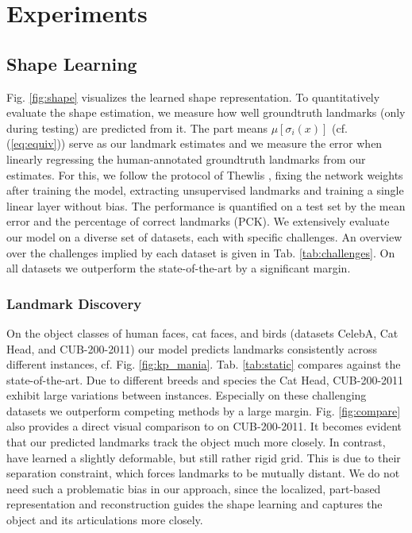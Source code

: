 \chapter{Experiments}

\section{Shape Learning}
	Fig. \ref{fig:shape} visualizes the learned shape representation.
	To quantitatively evaluate the shape estimation, we measure how well groundtruth landmarks (only during testing) are predicted from it.
	The part means $\mu[\sigma_i(x)]$ (cf. (\ref{eq:equiv})) serve as our landmark estimates and we measure the error when linearly regressing the human-annotated groundtruth landmarks from our estimates.
	For this, we follow the protocol of Thewlis \etal \cite{Thewlis:2017wi}, fixing the network weights after training the model, extracting unsupervised landmarks and training a single linear layer without bias.
	The performance is quantified on a test set by the mean error and the percentage of correct landmarks (PCK).
	We extensively evaluate our model on a diverse set of datasets, each with specific challenges. An overview over the challenges implied by each dataset is given in Tab. \ref{tab:challenges}.
	On all datasets we outperform the state-of-the-art by a significant margin.


	\subsection{Landmark Discovery}
		On the object classes of human faces, cat faces, and birds (datasets CelebA, Cat Head, and CUB-200-2011) our model predicts landmarks consistently across different instances, cf. Fig. \ref{fig:kp_mania}.
		Tab. \ref{tab:static} compares against the state-of-the-art. Due to different breeds and species the Cat Head, CUB-200-2011 exhibit large variations between instances. Especially on these challenging datasets we outperform competing methods by a large margin.
		Fig. \ref{fig:compare} also provides a direct visual comparison to \cite{Zhang:2018vz} on CUB-200-2011. It becomes evident that our predicted landmarks track the object much more closely. In contrast, \cite{Zhang:2018vz} have learned a slightly deformable, but still rather rigid grid.
		This is due to their separation constraint, which forces landmarks to be mutually distant. We do not need such a problematic bias in our approach, since the localized, part-based representation and reconstruction guides the shape learning and captures the object and its articulations more closely.
